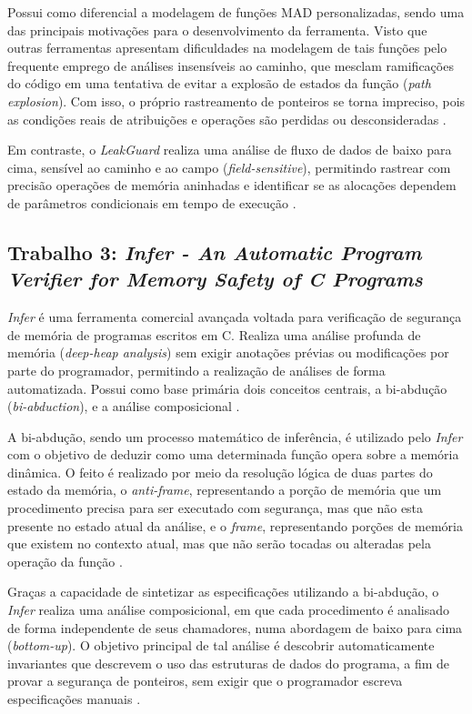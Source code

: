 \documentclass[
    12pt,                %
    openright,           %
    oneside,             %
    a4paper,             %
    english,             %
    brazil               %
]{abntex2}
\begin{document}
Possui como diferencial a modelagem de funções MAD personalizadas, sendo uma das principais motivações para o desenvolvimento da ferramenta. Visto que outras ferramentas apresentam dificuldades na modelagem de tais funções pelo frequente emprego de análises insensíveis ao caminho, que mesclam ramificações do código em uma tentativa de evitar a explosão de estados da função (\textit{path explosion}). Com isso, o próprio rastreamento 
de ponteiros se torna impreciso, pois as condições reais de atribuições e operações são perdidas ou desconsideradas \cite{LeakGuard2025}.

\par 
Em contraste, o \textit{LeakGuard} realiza uma análise de fluxo de dados de baixo para cima, sensível ao caminho e ao campo (\textit{field-sensitive}), permitindo rastrear com precisão operações de memória aninhadas e identificar se as alocações dependem de parâmetros condicionais em tempo de execução \cite{LeakGuard2025}.

\subsection{Trabalho 3: \textit{Infer - An Automatic Program Verifier for Memory Safety of C Programs}}
\label{sub:trabalho_3}

\textit{Infer} é uma ferramenta comercial avançada voltada para verificação de segurança de memória de programas escritos em C. Realiza uma análise profunda de memória (\textit{deep-heap analysis}) sem exigir anotações prévias ou modificações por parte do programador, permitindo a realização de análises de forma automatizada. Possui como base primária dois conceitos centrais, a bi-abdução (\textit{bi-abduction}), e a análise composicional \cite{Infer2011}.

\par
A bi-abdução, sendo um processo matemático de inferência, é utilizado pelo \textit{Infer} com o objetivo de deduzir como uma determinada função opera sobre a memória dinâmica. O feito é realizado por meio da resolução lógica de duas partes do estado da memória, o \textit{anti-frame}, representando a porção de memória que um procedimento precisa para ser executado com segurança, mas que não esta presente no estado atual da análise, e o \textit{frame}, 
representando porções de memória que existem no contexto atual, mas que não serão tocadas ou alteradas pela operação da função \cite{Calcagno2011}.

\par
Graças a capacidade de sintetizar as especificações utilizando a bi-abdução, o \textit{Infer} realiza uma análise composicional, em que cada procedimento é analisado de forma independente de seus chamadores, numa abordagem de baixo para cima (\textit{bottom-up}). O objetivo principal de tal análise é descobrir automaticamente invariantes que descrevem o uso das estruturas de dados do programa, a fim de provar a segurança de ponteiros, sem exigir que o programador escreva especificações manuais \cite{Infer2011}. 
\end{document}
